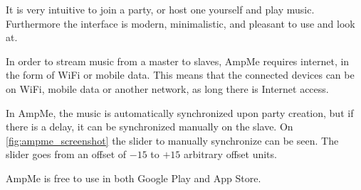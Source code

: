 It is very intuitive to join a party, or host one yourself and play music.
Furthermore the interface is modern, minimalistic, and pleasant to use and look at. 

In order to stream music from a master to slaves, AmpMe requires internet, in the form of WiFi or mobile data.
This means that the connected devices can be on WiFi, mobile data or another network, as long there is Internet access. 

In AmpMe, the music is automatically synchronized upon party creation,
but if there is a delay, it can be synchronized manually on the slave.
On \cref{fig:ampme_screenshot} the slider to manually synchronize can be seen.
The slider goes from an offset of $-15$ to $+15$ arbitrary offset units.

AmpMe is free to use in both Google Play and App Store.\cite{amp_faq}\cite{amp_play}\cite{amp_itunes}

